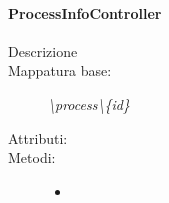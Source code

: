 \paragraph{ProcessInfoController}%
\begin{description}
	\item[Descrizione] 
	\item[Mappatura base:] \textit{\textbackslash process\textbackslash \{id\}}
	\item[Attributi:]
	\item[Metodi:]\begin{itemize}
					\item 
				\end{itemize}
\end{description}